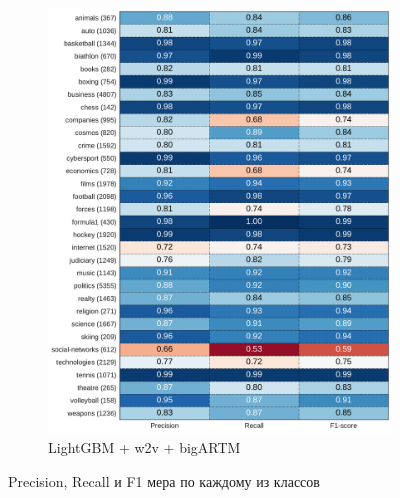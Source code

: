\documentclass[a4paper, 14pt]{extarticle}
\begin{document}
\begin{figure}[t!]
\begin{subfigure}[t]{0.5\textwidth}
		\includegraphics[width=1\textwidth]{lgb_w2v_bigartm_classif_report.pdf}
		\caption{LightGBM + w2v + bigARTM}
	\end{subfigure}
	\caption{Precision, Recall и F1 мера по каждому из классов}
\end{figure}
\end{document}
